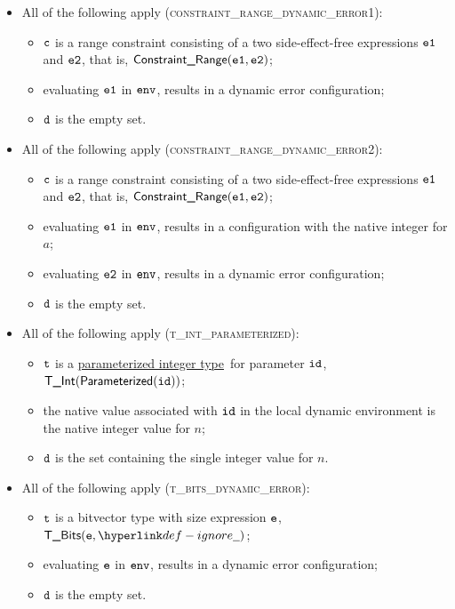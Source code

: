 \documentclass{book}
\newcommand\parameterizedintegertype[0]{\hyperlink{def-parameterizedintegertype}{parameterized integer type}}
\begin{document}
\begin{itemize}
  \item All of the following apply (\textsc{constraint\_range\_dynamic\_error1}):
  \begin{itemize}
    \item $\texttt{c}$ is a range constraint consisting of a two side-effect-free expressions $\texttt{e1}$ and $\texttt{e2}$, that is, $\textsf{Constraint\_Range}(\texttt{e1}, \texttt{e2})$;
    \item evaluating $\texttt{e1}$ in $\texttt{env}$, results in a dynamic error configuration;
    \item $\texttt{d}$ is the empty set.
  \end{itemize}

  \item All of the following apply (\textsc{constraint\_range\_dynamic\_error2}):
  \begin{itemize}
    \item $\texttt{c}$ is a range constraint consisting of a two side-effect-free expressions $\texttt{e1}$ and $\texttt{e2}$, that is, $\textsf{Constraint\_Range}(\texttt{e1}, \texttt{e2})$;
    \item evaluating $\texttt{e1}$ in $\texttt{env}$, results in a configuration with the native integer for $a$;
    \item evaluating $\texttt{e2}$ in $\texttt{env}$, results in a dynamic error configuration;
    \item $\texttt{d}$ is the empty set.
  \end{itemize}

  \item All of the following apply (\textsc{t\_int\_parameterized}):
  \begin{itemize}
    \item $\texttt{t}$ is a \parameterizedintegertype\ for parameter $\texttt{id}$, \\ $\textsf{T\_Int}(\textsf{Parameterized}(\texttt{id}))$;
    \item the native value associated with $\texttt{id}$ in the local dynamic environment is the native integer value for $n$;
    \item $\texttt{d}$ is the set containing the single integer value for $n$.
  \end{itemize}

  \item All of the following apply (\textsc{t\_bits\_dynamic\_error}):
  \begin{itemize}
    \item $\texttt{t}$ is a bitvector type with size expression $\texttt{e}$, $\TBits(\ve, \Ignore)$;
    \item evaluating $\texttt{e}$ in $\texttt{env}$, results in a dynamic error configuration;
    \item $\texttt{d}$ is the empty set.
  \end{itemize}


\end{itemize}
\end{document}
